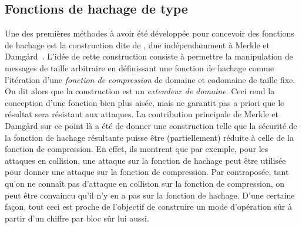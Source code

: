 \subsection{Fonctions de hachage de type \merkdam}
\label{sec:fmd}

Une des premières méthodes à avoir été développée pour concevoir des fonctions de hachage est la construction dite de \merkdam,
due indépendamment à Merkle et Damg\aa rd~\cite{DBLP:conf/crypto/Merkle89a,DBLP:conf/crypto/Damgard89a}.
L'idée de cette construction consiste à permettre la manipulation de messages de taille arbitraire en définissant
une fonction de hachage comme l'itération d'une \emph{fonction de compression} de domaine et codomaine de
taille fixe. On dit alors que la construction est un \emph{extendeur de domaine}.
Ceci rend la conception d'une fonction bien plus aisée, mais ne garantit pas a priori que le résultat sera résistant aux attaques.
La contribution principale de Merkle et Damg\aa rd sur ce point là a été de donner une construction telle que la sécurité de la fonction
de hachage résultante puisse être (partiellement) réduite à celle de la fonction de compression. En effet, ils montrent que par exemple,
pour les attaques en collision, une attaque sur la fonction de hachage peut être utilisée pour donner une attaque sur la fonction
de compression. Par contraposée, tant qu'on ne connaît pas d'attaque en collision sur la fonction de compression, on peut être convaincu
qu'il n'y en a pas sur la fonction de hachage. D'une certaine façon, tout ceci est proche de l'objectif de construire un mode d'opération sûr
à partir d'un chiffre par bloc sûr lui aussi. 

